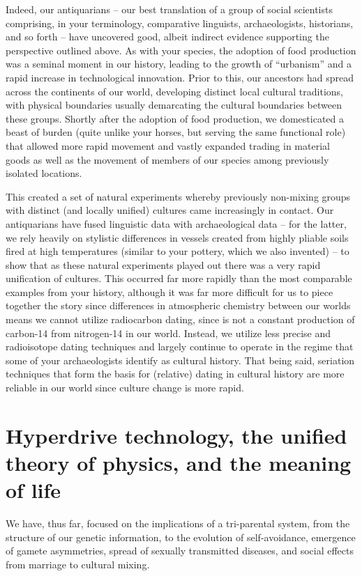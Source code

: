 \documentclass{report}
\begin{document}
Indeed, our antiquarians -- our best translation of a group of social scientists comprising, in your terminology, comparative linguists, archaeologists, historians, and so forth -- have uncovered good, albeit indirect evidence supporting the perspective outlined above. As with your species, the adoption of food production was a seminal moment in our history, leading to the growth of ``urbanism'' and a rapid increase in technological innovation. Prior to this, our ancestors had spread across the continents of our world, developing distinct local cultural traditions, with physical boundaries usually demarcating the cultural boundaries between these groups. Shortly after the adoption of food production, we domesticated a beast of burden (quite unlike your horses, but serving the same functional role) that allowed more rapid movement and vastly expanded trading in material goods as well as the movement of members of our species among previously isolated locations.

This created a set of natural experiments whereby previously non-mixing groups with distinct (and locally unified) cultures came increasingly in contact. Our antiquarians have fused linguistic data with archaeological data -- for the latter, we rely heavily on stylistic differences in vessels created from highly pliable soils fired at high temperatures (similar to your pottery, which we also invented) -- to show that as these natural experiments played out there was a very rapid unification of cultures. This occurred far more rapidly than the most comparable examples from your history, although it was far more difficult for us to piece together the story since differences in atmospheric chemistry between our worlds means we cannot utilize radiocarbon dating, since is not a constant production of carbon-14 from nitrogen-14 in our world. Instead, we utilize less precise and radioisotope dating techniques and largely continue to operate in the regime that some of your archaeologists identify as cultural history. That being said, seriation techniques that form the basis for (relative) dating in cultural history are more reliable in our world since culture change is more rapid.


\section*{Hyperdrive technology, the unified theory of physics, and the meaning of life}

We have, thus far, focused on the implications of a tri-parental system, from the structure of our genetic information, to the evolution of self-avoidance, emergence of gamete asymmetries, spread of sexually transmitted diseases, and social effects from marriage to cultural mixing. 
\end{document}
